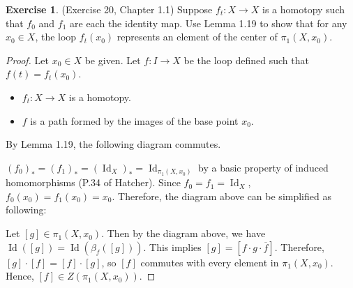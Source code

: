 \documentclass[12pt, psamsfonts]{amsart}
\theoremstyle{definition}
\newtheorem{exer}[thm]{Exercise}
\theoremstyle{remark}
\DeclareMathOperator{\Id}{Id}
\numberwithin{equation}{section}
\begin{document}
\begin{exer}{(Exercise 20, Chapter 1.1)}
  Suppose $f_t: X \rightarrow X$ is a homotopy such that $f_0$ and $f_1$ are each the identity map.
  Use Lemma 1.19 to show that for any $x_0 \in X$, the loop $f_t(x_0)$ represents an element of the center of $\pi_1(X, x_0)$.
\end{exer}

\begin{proof}
  Let $x_0 \in X$ be given.
  Let $f: I \rightarrow X$ be the loop defined such that $f(t) = f_t(x_0)$.
  \begin{itemize}
    \item
      $f_t: X \rightarrow X$ is a homotopy.
    \item
      $f$ is a path formed by the images of the base point $x_0$.
  \end{itemize}
  By Lemma 1.19, the following diagram commutes.

  \begin{center}
  \end{center}

  $(f_0)_* = (f_1)_* = (\Id_X)_* = \Id_{\pi_1(X, x_0)}$ by a basic property of induced homomorphisms (P.34 of Hatcher).
  Since $f_0 = f_1 = \Id_X$, $f_0(x_0) = f_1(x_0) = x_0$.
  Therefore, the diagram above can be simplified as following:

  \begin{center}
  \end{center}

  Let $[g] \in \pi_1(X, x_0)$.
  Then by the diagram above, we have $\Id([g]) = \Id(\beta_f([g]))$.
  This implies $[g] = [f \cdot g \cdot \overline{f}]$.
  Therefore, $[g] \cdot [f] = [f] \cdot [g]$, so $[f]$ commutes with every element in $\pi_1(X, x_0)$.
  Hence, $[f] \in Z(\pi_1(X, x_0))$.

\end{proof}
\end{document}
